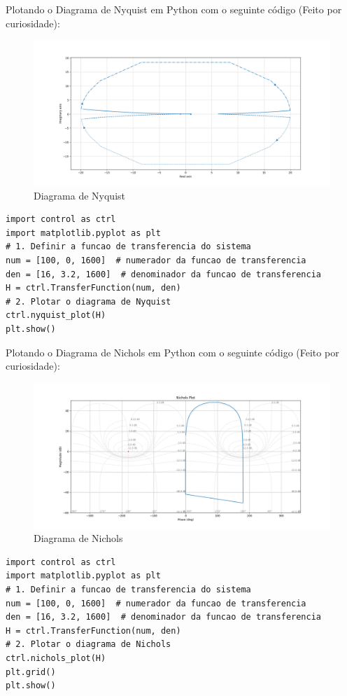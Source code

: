 \documentclass[10pt]{article}
\begin{document}
\quad Plotando o Diagrama de Nyquist em Python com o seguinte código (Feito por curiosidade):

\begin{figure}[h]
    \centering
    \includegraphics[scale=0.45]{nyquist.png}
    \caption{Diagrama de Nyquist}
\end{figure}

\begin{lstlisting}
import control as ctrl
import matplotlib.pyplot as plt
# 1. Definir a funcao de transferencia do sistema
num = [100, 0, 1600]  # numerador da funcao de transferencia
den = [16, 3.2, 1600]  # denominador da funcao de transferencia
H = ctrl.TransferFunction(num, den)
# 2. Plotar o diagrama de Nyquist
ctrl.nyquist_plot(H)
plt.show()
\end{lstlisting}

\newpage

\quad Plotando o Diagrama de Nichols em Python com o seguinte código (Feito por curiosidade):

\begin{figure}[h]
    \centering
    \includegraphics[scale=0.45]{nichols.png}
    \caption{Diagrama de Nichols}
\end{figure}

\begin{lstlisting}
import control as ctrl
import matplotlib.pyplot as plt
# 1. Definir a funcao de transferencia do sistema
num = [100, 0, 1600]  # numerador da funcao de transferencia
den = [16, 3.2, 1600]  # denominador da funcao de transferencia
H = ctrl.TransferFunction(num, den)
# 2. Plotar o diagrama de Nichols
ctrl.nichols_plot(H)
plt.grid()
plt.show()
\end{lstlisting}
\end{document}
